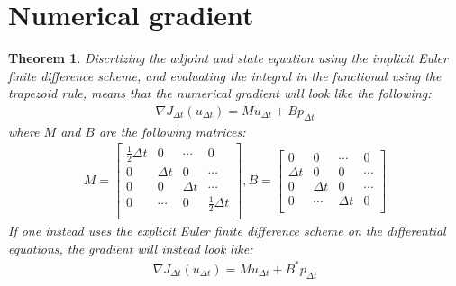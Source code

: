 \documentclass[11pt,a4paper]{article}
\newtheorem{theorem}{Theorem}
\begin{document}
\section{Numerical gradient}
\begin{theorem}
Discrtizing the adjoint and state equation using the implicit Euler finite difference scheme, and evaluating the integral in the functional using the trapezoid rule, means that the numerical gradient will look like the following:
\begin{align*}
\nabla J_{\Delta t}(u_{\Delta t}) = Mu_{\Delta t} + Bp_{\Delta t}
\end{align*}
where $M$ and $B$ are the following matrices:
\begin{align*}
M=\left[ \begin{array}{cccc}
   \frac{1}{2}\Delta t & 0 & \cdots & 0 \\  
   0& \Delta t & 0 & \cdots \\ 
   0 &0 & \Delta t  & \cdots \\
   0 &\cdots &0 & \frac{1}{2}\Delta t   \\
   \end{array}  \right] 
,B = \left[ \begin{array}{cccc}
   0& 0 & \cdots & 0 \\  
   \Delta t& 0 & 0 & \cdots \\ 
   0 & \Delta t& 0  & \cdots \\
   0 &\cdots & \Delta t& 0   \\
   \end{array}  \right] 
\end{align*}
If one instead uses the explicit Euler finite difference scheme on the differential equations, the gradient will instead look like:
\begin{align*}
\nabla J_{\Delta t}(u_{\Delta t}) = Mu_{\Delta t} + B^*p_{\Delta t}
\end{align*}
\end{theorem}
\end{document}
